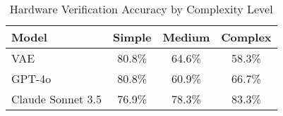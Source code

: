 \begin{table}[h]
\centering
\caption{Hardware Verification Accuracy by Complexity Level}
\label{tab:complexity_results}
\begin{tabular}{lccc}
\toprule
\textbf{Model} & \textbf{Simple} & \textbf{Medium} & \textbf{Complex} \\
\midrule
VAE & 80.8\% & 64.6\% & 58.3\% \\
GPT-4o & 80.8\% & 60.9\% & 66.7\% \\
Claude Sonnet 3.5 & 76.9\% & 78.3\% & 83.3\% \\
\bottomrule
\end{tabular}
\end{table}